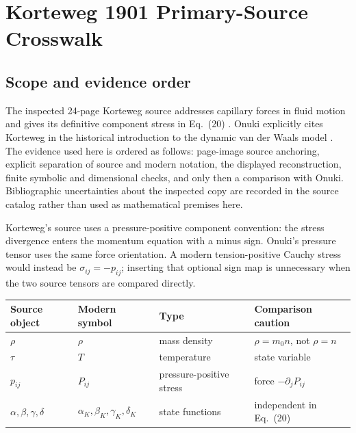\section{Korteweg 1901 Primary-Source Crosswalk}
\label{app:korteweg-primary-crosswalk}


\subsection*{Scope and evidence order}

The inspected 24-page Korteweg source addresses capillary forces in fluid
motion and gives its definitive component stress in Eq.~(20)
\citep{Korteweg1901}.  Onuki explicitly cites Korteweg in the historical
introduction to the dynamic van der Waals model \citep{Onuki2007PRE}.  The
evidence used here is ordered as follows: page-image source anchoring,
explicit separation of source and modern notation, the displayed
reconstruction, finite symbolic and dimensional checks, and only then a
comparison with Onuki. Bibliographic uncertainties about the inspected copy are
recorded in the source catalog rather than used as mathematical premises here.

Korteweg's source uses a pressure-positive component convention: the stress
divergence enters the momentum equation with a minus sign.  Onuki's pressure
tensor uses the same force orientation.  A modern tension-positive Cauchy stress
would instead be \(\sigma_{ij}=-p_{ij}\); inserting that optional sign map is
unnecessary when the two source tensors are compared directly.

\begin{center}
\small
\begin{tabular}{@{}llll@{}}
\toprule
Source object & Modern symbol & Type & Comparison caution \\
\midrule
\(\rho\) & \(\rho\) & mass density & \(\rho=m_0n\), not \(\rho=n\) \\
\(\tau\) & \(T\) & temperature & state variable \\
\(p_{ij}\) & \(P_{ij}\) & pressure-positive stress & force \(-\partial_jP_{ij}\) \\
\(\alpha,\beta,\gamma,\delta\) & \(\alpha_K,\beta_K,\gamma_K,\delta_K\) & state functions & independent in Eq.~(20) \\
\bottomrule
\end{tabular}
\end{center}

